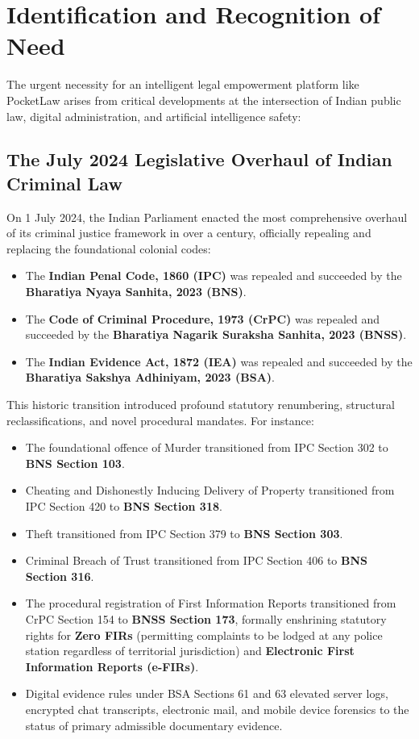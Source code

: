 \section{Identification and Recognition of Need}
\label{sec:identification_need}

The urgent necessity for an intelligent legal empowerment platform like PocketLaw arises from critical developments at the intersection of Indian public law, digital administration, and artificial intelligence safety:

\subsection{The July 2024 Legislative Overhaul of Indian Criminal Law}
On 1 July 2024, the Indian Parliament enacted the most comprehensive overhaul of its criminal justice framework in over a century, officially repealing and replacing the foundational colonial codes:
\begin{itemize}
    \item The \textbf{Indian Penal Code, 1860 (IPC)} was repealed and succeeded by the \textbf{Bharatiya Nyaya Sanhita, 2023 (BNS)}.
    \item The \textbf{Code of Criminal Procedure, 1973 (CrPC)} was repealed and succeeded by the \textbf{Bharatiya Nagarik Suraksha Sanhita, 2023 (BNSS)}.
    \item The \textbf{Indian Evidence Act, 1872 (IEA)} was repealed and succeeded by the \textbf{Bharatiya Sakshya Adhiniyam, 2023 (BSA)}.
\end{itemize}

This historic transition introduced profound statutory renumbering, structural reclassifications, and novel procedural mandates. For instance:
\begin{itemize}
    \item The foundational offence of Murder transitioned from IPC Section 302 to \textbf{BNS Section 103}.
    \item Cheating and Dishonestly Inducing Delivery of Property transitioned from IPC Section 420 to \textbf{BNS Section 318}.
    \item Theft transitioned from IPC Section 379 to \textbf{BNS Section 303}.
    \item Criminal Breach of Trust transitioned from IPC Section 406 to \textbf{BNS Section 316}.
    \item The procedural registration of First Information Reports transitioned from CrPC Section 154 to \textbf{BNSS Section 173}, formally enshrining statutory rights for \textbf{Zero FIRs} (permitting complaints to be lodged at any police station regardless of territorial jurisdiction) and \textbf{Electronic First Information Reports (e-FIRs)}.
    \item Digital evidence rules under BSA Sections 61 and 63 elevated server logs, encrypted chat transcripts, electronic mail, and mobile device forensics to the status of primary admissible documentary evidence.
\end{itemize}

